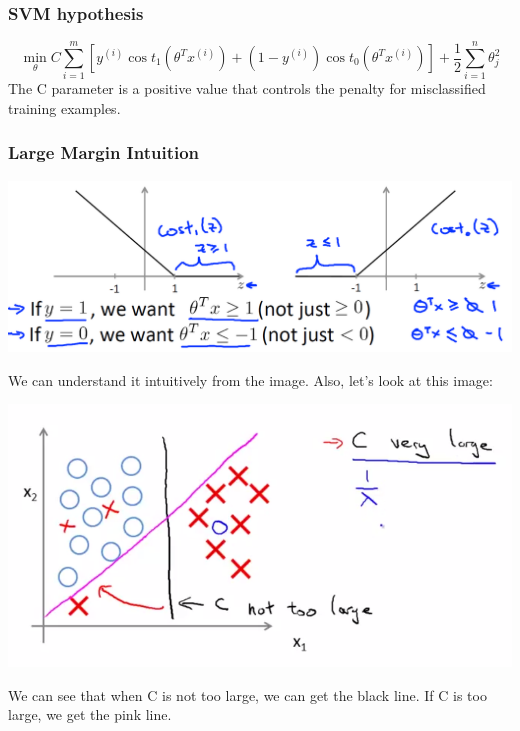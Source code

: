 \documentclass{article}
\begin{document}
\subsubsection{SVM hypothesis}
\[\min\limits_{\theta}C\sum_{i=1}^m[y^{(i)}\cos t_1(\theta^Tx^{(i)}) + (1-y^{(i)})\cos t_0(\theta^Tx^{(i)})] + \frac{1}{2}\sum_{i=1}^n\theta_j^2\]
The C parameter is a positive value that controls the penalty for misclassified training examples.

\subsubsection{Large Margin Intuition}
\begin{center}
\includegraphics[scale=0.3]{6.png}
\end{center}
We can understand it intuitively from the image. Also, let's look at this image:
\begin{center}
\includegraphics[scale=0.4]{5.png}
\end{center}
We can see that when C is not too large, we can get the black line. If C is too large, we get the pink line.
\end{document}
